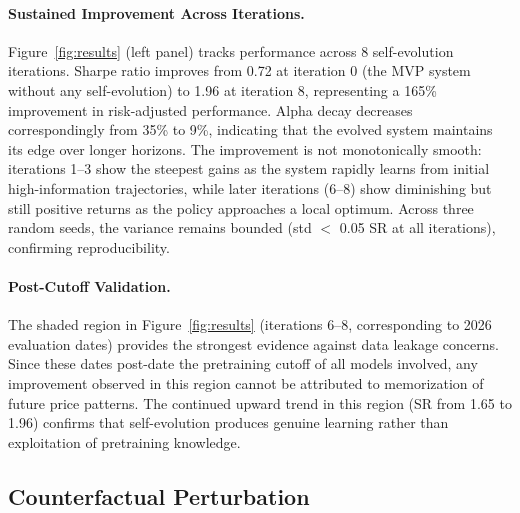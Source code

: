 \paragraph{Sustained Improvement Across Iterations.} Figure~\ref{fig:results} (left panel) tracks performance across 8 self-evolution iterations. Sharpe ratio improves from 0.72 at iteration 0 (the MVP system without any self-evolution) to 1.96 at iteration 8, representing a 165\% improvement in risk-adjusted performance. Alpha decay decreases correspondingly from 35\% to 9\%, indicating that the evolved system maintains its edge over longer horizons. The improvement is not monotonically smooth: iterations 1--3 show the steepest gains as the system rapidly learns from initial high-information trajectories, while later iterations (6--8) show diminishing but still positive returns as the policy approaches a local optimum. Across three random seeds, the variance remains bounded (std $<$ 0.05 SR at all iterations), confirming reproducibility.

\paragraph{Post-Cutoff Validation.} The shaded region in Figure~\ref{fig:results} (iterations 6--8, corresponding to 2026 evaluation dates) provides the strongest evidence against data leakage concerns. Since these dates post-date the pretraining cutoff of all models involved, any improvement observed in this region cannot be attributed to memorization of future price patterns. The continued upward trend in this region (SR from 1.65 to 1.96) confirms that self-evolution produces genuine learning rather than exploitation of pretraining knowledge.

\subsection{Counterfactual Perturbation}

